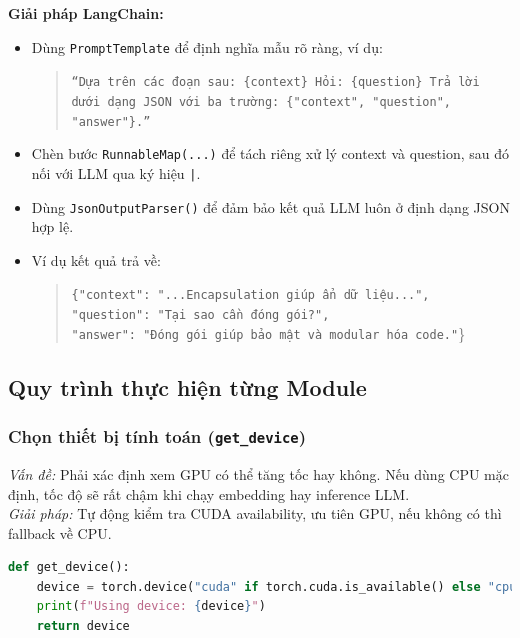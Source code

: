 \documentclass[11pt]{article}
\begin{document}
\noindent \textbf{Giải pháp LangChain:}\\
\begin{itemize}
    \item Dùng \texttt{PromptTemplate} để định nghĩa mẫu rõ ràng, ví dụ:
    \begin{quote}
    \texttt{“Dựa trên các đoạn sau: \{context\}\\
    Hỏi: \{question\}\\
    Trả lời dưới dạng JSON với ba trường: \{"context", "question", "answer"\}.”}
    \end{quote}
    \item Chèn bước \texttt{RunnableMap(...)} để tách riêng xử lý context và question, sau đó nối với LLM qua ký hiệu \texttt{|}.
    \item Dùng \texttt{JsonOutputParser()} để đảm bảo kết quả LLM luôn ở định dạng JSON hợp lệ.
    \item Ví dụ kết quả trả về:
    \begin{quote}
        \texttt{\{"context": "...Encapsulation giúp ẩn dữ liệu...",}\\
        \texttt{"question": "Tại sao cần đóng gói?",}\\
        \texttt{"answer": "Đóng gói giúp bảo mật và modular hóa code."}\}
    \end{quote}
\end{itemize}


\subsection{Quy trình thực hiện từng Module}
\label{sec:code_modules}

\subsubsection*{Chọn thiết bị tính toán (\texttt{get\_device})}

\textit{Vấn đề:} Phải xác định xem GPU có thể tăng tốc hay không. Nếu dùng CPU mặc định, tốc độ sẽ rất chậm khi chạy embedding hay inference LLM.\\

\noindent\textit{Giải pháp:} Tự động kiểm tra CUDA availability, ưu tiên GPU, nếu không có thì fallback về CPU.\\

\begin{lstlisting}[language=Python, caption=Chọn thiết bị tính toán]
def get_device():
    device = torch.device("cuda" if torch.cuda.is_available() else "cpu")
    print(f"Using device: {device}")
    return device
\end{lstlisting}
\end{document}
